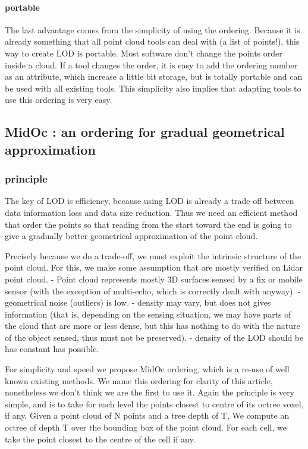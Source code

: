 			\paragraph{portable}
				The last advantage comes from the simplicity of using the ordering. 
				Because it is already something that all point cloud tools can deal with (a list of points!), this way to create LOD is portable. Most software don't change the points order inside a cloud.
				If a tool changes the order, it is easy to add the ordering number as an attribute, which increase a little bit storage, but is totally portable and can be used with all existing tools.
				This simplicity also implies that adapting tools to use this ordering is very easy.
	
	\subsection{MidOc : an ordering for gradual geometrical approximation}
		\subsubsection{principle}
			The key of LOD is efficiency, because using LOD is already a trade-off between data information loss and data size reduction.
			Thus we need an efficient method that order the points so that reading from the start toward the end is going to give a gradually better geometrical approximation of the point cloud.
			
			Precisely because we do a trade-off, we must exploit the intrinsic structure of the point cloud.
			For this, we make some assumption that are mostly verified on Lidar point cloud.
			- Point cloud represents mostly 3D surfaces sensed by a fix or mobile sensor (with the exception of multi-echo, which is correctly dealt with anyway).
			- geometrical noise (outliers) is low.
			- density may vary, but does not gives information (that is, depending on the sensing situation, we may have parts of the cloud that are more or less dense, but this has nothing to do with the nature of the object sensed, thus must not be preserved).
			- density of the LOD should be has constant has possible.
			
			For simplicity and speed we propose MidOc ordering, which is a re-use of well known existing methods.
			We name this ordering for clarity of this article, nonetheless we don't think we are the first to use it.
			Again the principle is very simple, and is to take for each level the points closest to centre of its octree voxel, if any.
			Given a point cloud of N points and a tree depth of T,
			We compute an octree of depth T over the bounding box of the point cloud.
			For each cell, we take the point closest to the centre of the cell if any.
			
